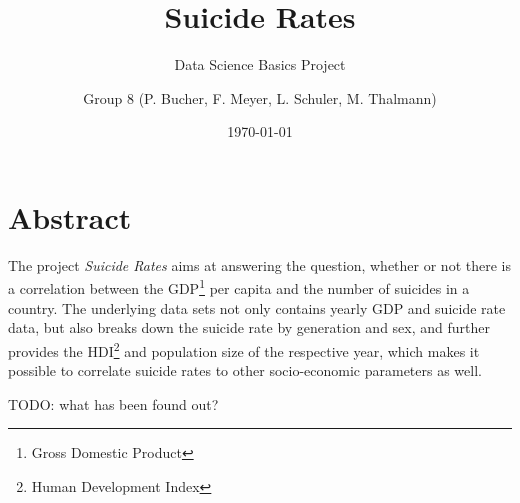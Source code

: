 \author{Group 8 (P. Bucher, F. Meyer, L. Schuler, M. Thalmann)}
\title{Suicide Rates}
\subtitle{Data Science Basics Project}
\date{\today}
\maketitle

\section*{Abstract}

The project \textit{Suicide Rates} aims at answering the question, whether or not there is a correlation between the GDP\footnote{Gross Domestic Product} per capita and the number of suicides in a country. The underlying data sets not only contains yearly GDP and suicide rate data, but also breaks down the suicide rate by generation and sex, and further provides the HDI\footnote{Human Development Index} and population size of the respective year, which makes it possible to correlate suicide rates to other socio-economic parameters as well.

TODO: what has been found out?
